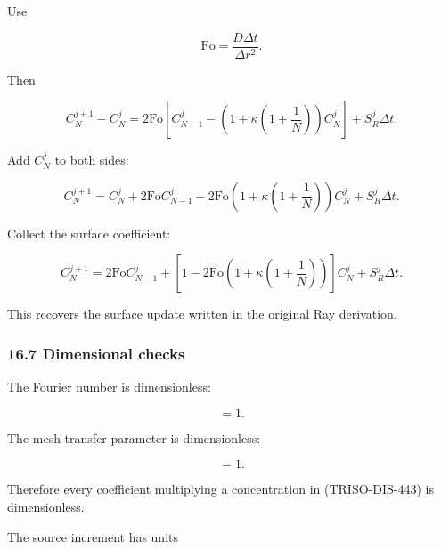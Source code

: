 \documentclass[11pt,a4paper]{article}
\begin{document}
Use

\begin{equation}
\mathrm{Fo}
=
\frac{D\Delta t}{\Delta r^2}.
\tag{TRISO-DIS-440}
\label{eq:triso-dis-440}
\end{equation}

Then

\begin{equation}
C_N^{j+1}-C_N^j
=
2\mathrm{Fo}
\left[
C_{N-1}^j
-
\left(
1+\kappa\left(1+\frac1N\right)
\right)
C_N^j
\right]
+
S_R^j\Delta t.
\tag{TRISO-DIS-441}
\label{eq:triso-dis-441}
\end{equation}

Add $C_N^j$ to both sides:

\begin{equation}
C_N^{j+1}
=
C_N^j
+
2\mathrm{Fo}C_{N-1}^j
-
2\mathrm{Fo}
\left(
1+\kappa\left(1+\frac1N\right)
\right)
C_N^j
+
S_R^j\Delta t.
\tag{TRISO-DIS-442}
\label{eq:triso-dis-442}
\end{equation}

Collect the surface coefficient:

\begin{equation}
\boxed{
C_N^{j+1}
=
2\mathrm{Fo}C_{N-1}^j
+
\left[
1
-
2\mathrm{Fo}
\left(
1+\kappa\left(1+\frac1N\right)
\right)
\right]
C_N^j
+
S_R^j\Delta t.
}
\tag{TRISO-DIS-443}
\label{eq:triso-dis-443}
\end{equation}

This recovers the surface update written in the original Ray derivation.

\subsubsection*{16.7 Dimensional checks}

The Fourier number is dimensionless:

\begin{equation}
[\mathrm{Fo}]=1.
\tag{TRISO-DIS-444}
\label{eq:triso-dis-444}
\end{equation}

The mesh transfer parameter is dimensionless:

\begin{equation}
[\kappa]=1.
\tag{TRISO-DIS-445}
\label{eq:triso-dis-445}
\end{equation}

Therefore every coefficient multiplying a concentration in (TRISO-DIS-443) is dimensionless.

The source increment has units
\end{document}
